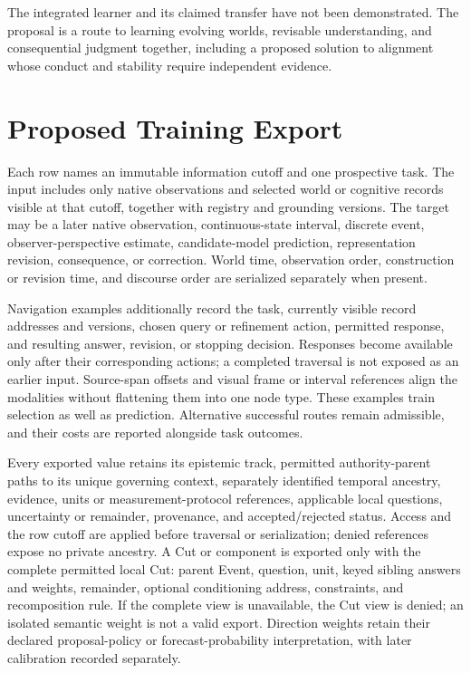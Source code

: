 \documentclass[10pt]{article}
\begin{document}
The integrated learner and its claimed transfer have not been demonstrated.
The proposal is a route to learning evolving worlds, revisable understanding,
and consequential judgment together, including a proposed solution to
alignment whose conduct and stability require independent evidence.

\appendix

\section{Proposed Training Export}
\label{app:training-export}

Each row names an immutable information cutoff and one prospective task. The
input includes only native observations and selected world or cognitive records
visible at that cutoff, together with registry and grounding versions. The
target may be a later native observation, continuous-state interval, discrete
event, observer-perspective estimate, candidate-model prediction, representation
revision, consequence, or correction. World time, observation order,
construction or revision time, and discourse order are serialized separately
when present.

Navigation examples additionally record the task, currently visible record
addresses and versions, chosen query or refinement action, permitted response,
and resulting answer, revision, or stopping decision. Responses become
available only after their corresponding actions; a completed traversal is
not exposed as an earlier input. Source-span offsets and visual frame or
interval references align the modalities without flattening them into one
node type. These examples train selection as well as prediction. Alternative
successful routes remain admissible, and their costs are reported alongside
task outcomes.

Every exported value retains its epistemic track, permitted authority-parent
paths to its unique governing context, separately identified temporal ancestry,
evidence, units or measurement-protocol references, applicable local questions,
uncertainty or remainder, provenance, and
accepted/rejected status. Access and the row cutoff are applied before
traversal or serialization; denied references expose no private ancestry.
A Cut or component is exported only with the complete permitted local Cut:
parent Event, question, unit, keyed sibling answers and weights, remainder,
optional conditioning address, constraints, and recomposition rule.
If the complete view is unavailable, the Cut view is denied; an isolated
semantic weight is not a valid export. Direction weights retain their
declared proposal-policy or forecast-probability interpretation, with later
calibration recorded separately.
\end{document}
